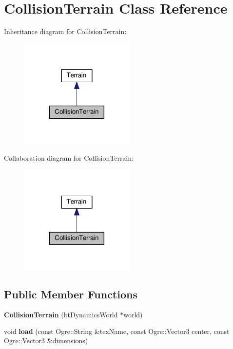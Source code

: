 \hypertarget{class_collision_terrain}{}\section{Collision\+Terrain Class Reference}
\label{class_collision_terrain}


Inheritance diagram for Collision\+Terrain\+:\nopagebreak
\begin{figure}[H]
\begin{center}
\leavevmode
\includegraphics[width=164pt]{class_collision_terrain__inherit__graph}
\end{center}
\end{figure}


Collaboration diagram for Collision\+Terrain\+:\nopagebreak
\begin{figure}[H]
\begin{center}
\leavevmode
\includegraphics[width=164pt]{class_collision_terrain__coll__graph}
\end{center}
\end{figure}
\subsection*{Public Member Functions}
\begin{DoxyCompactItemize}
\item 
\mbox{\label{class_collision_terrain_a078c7bd488c50c875403d6fa6b387ab6}} 
{\bfseries Collision\+Terrain} (bt\+Dynamics\+World $\ast$world)
\item 
\mbox{\label{class_collision_terrain_a82f5e298e95755e30b873aae483b006d}} 
void {\bfseries load} (const Ogre\+::\+String \&tex\+Name, const Ogre\+::\+Vector3 center, const Ogre\+::\+Vector3 \&dimensions)
\end{DoxyCompactItemize}
